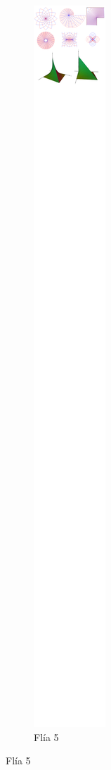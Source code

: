 \begin{figure}[t!]
\begin{subfigure}[t]{0.5\textwidth}
\centering
\includegraphics[scale=0.5,trim={386px 9612px 378px 348px},clip]{images/04_analisis2/am2.png}
\caption{Flía 5}
\end{subfigure}%

\end{figure}
